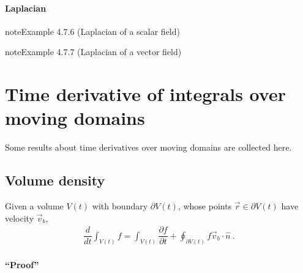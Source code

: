 \documentclass[letterpaper,10pt,english]{jupyterBook}
\begin{document}
\subsubsection{Laplacian}
\label{\detokenize{ch/tensor-algebra-calculus/calculus-euclidean-spherical:laplacian}}\label{\detokenize{ch/tensor-algebra-calculus/calculus-euclidean-spherical:tensor-calculus-spherical-differential-operators-laplacian}}\label{ch/tensor-algebra-calculus/calculus-euclidean-spherical:example-5}
\begin{sphinxadmonition}{note}{Example 4.7.6 (Laplacian of a scalar field)}


\end{sphinxadmonition}
\label{ch/tensor-algebra-calculus/calculus-euclidean-spherical:example-6}
\begin{sphinxadmonition}{note}{Example 4.7.7 (Laplacian of a vector field)}


\end{sphinxadmonition}

\sphinxstepscope


\chapter{Time derivative of integrals over moving domains}
\label{\detokenize{ch/tensor-algebra-calculus/time-derivative-of-integrals:time-derivative-of-integrals-over-moving-domains}}\label{\detokenize{ch/tensor-algebra-calculus/time-derivative-of-integrals:tensor-calculus-time-derivative-of-integrals}}\label{\detokenize{ch/tensor-algebra-calculus/time-derivative-of-integrals::doc}}
\sphinxAtStartPar
Some results about time derivatives over moving domains are collected here.


\section{Volume density}
\label{\detokenize{ch/tensor-algebra-calculus/time-derivative-of-integrals:volume-density}}\label{\detokenize{ch/tensor-algebra-calculus/time-derivative-of-integrals:tensor-calculus-time-derivative-of-integrals-volume-density}}
\sphinxAtStartPar
{}
Given a volume \(V(t)\) with boundary \(\partial V(t)\), whose points \(\vec{r} \in \partial V(t)\) have velocity \(\vec{v}_b\),
\begin{equation*}
\begin{split}\dfrac{d}{dt} \int_{V(t)} f = \int_{V(t)} \dfrac{\partial f}{\partial t} + \oint_{\partial V(t)} f \vec{v}_b \cdot \hat{n} \ .\end{split}
\end{equation*}\subsubsection*{“Proof”}
\end{document}
